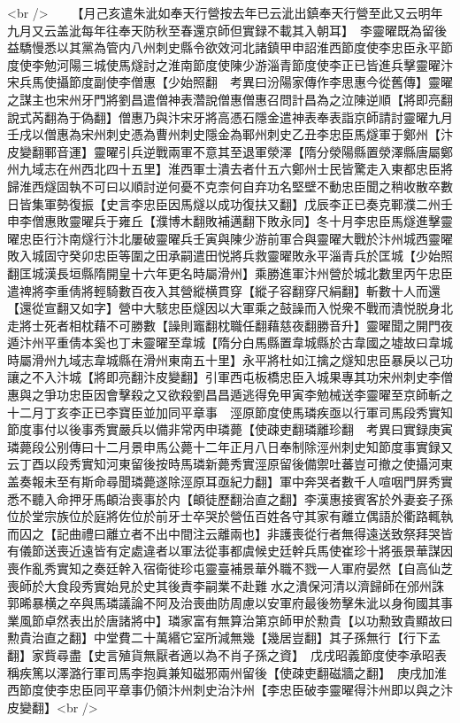 <br />
　　【月己亥遣朱泚如奉天行營按去年已云泚出鎮奉天行營至此又云明年九月又云盖泚每年往奉天防秋至春還京師但實録不載其入朝耳】　李靈曜既為留後益驕慢悉以其黨為管内八州刺史縣令欲效河北諸鎮甲申詔淮西節度使李忠臣永平節度使李勉河陽三城使馬燧討之淮南節度使陳少游淄青節度使李正已皆進兵擊靈曜汴宋兵馬使攝節度副使李僧惠【少始照翻　考異曰汾陽家傳作李思惠今從舊傳】靈曜之謀主也宋州牙門將劉昌遣僧神表濳說僧惠僧惠召問計昌為之泣陳逆順【將即亮翻說式芮翻為于偽翻】僧惠乃與汴宋牙將高憑石隱金遣神表奉表詣京師請討靈曜九月壬戌以僧惠為宋州刺史憑為曹州刺史隱金為鄆州刺史乙丑李忠臣馬燧軍于鄭州【汴皮變翻鄆音運】靈曜引兵逆戰兩軍不意其至退軍滎澤【隋分滎陽縣置滎澤縣唐屬鄭州九域志在州西北四十五里】淮西軍士潰去者什五六鄭州士民皆驚走入東都忠臣將歸淮西燧固執不可曰以順討逆何憂不克柰何自弃功名堅壁不動忠臣聞之稍收散卒數日皆集軍勢復振【史言李忠臣因馬燧以成功復扶又翻】戊辰李正已奏克鄆濮二州壬申李僧惠敗靈曜兵于雍丘【濮博木翻敗補邁翻下敗永同】冬十月李忠臣馬燧進擊靈曜忠臣行汴南燧行汴北屢破靈曜兵壬寅與陳少游前軍合與靈曜大戰於汴州城西靈曜敗入城固守癸卯忠臣等圍之田承嗣遣田悦將兵救靈曜敗永平淄青兵於匡城【少始照翻匡城漢長垣縣隋開皇十六年更名時屬滑州】乘勝進軍汴州營於城北數里丙午忠臣遣禆將李重倩將輕騎數百夜入其營縱横貫穿【縱子容翻穿尺絹翻】斬數十人而還【還從宣翻又如字】營中大駭忠臣燧因以大軍乘之鼓譟而入悦衆不戰而潰悦脱身北走將士死者相枕藉不可勝數【譟則竈翻枕職任翻藉慈夜翻勝音升】靈曜聞之開門夜遁汴州平重倩本奚也丁未靈曜至韋城【隋分白馬縣置韋城縣於古韋國之墟故曰韋城時屬滑州九域志韋城縣在滑州東南五十里】永平將杜如江擒之燧知忠臣暴戾以己功讓之不入汴城【將即亮翻汴皮變翻】引軍西屯板橋忠臣入城果專其功宋州刺史李僧惠與之爭功忠臣因會擊殺之又欲殺劉昌昌遁逃得免甲寅李勉械送李靈曜至京師斬之　十二月丁亥李正已李寶臣並加同平章事　涇原節度使馬璘疾亟以行軍司馬段秀實知節度事付以後事秀實嚴兵以備非常丙申璘薨【使疎吏翻璘離珍翻　考異曰實録庚寅璘薨段公别傳曰十二月景申馬公薨十二年正月八日奉制除涇州刺史知節度事實録又云丁酉以段秀實知河東留後按時馬璘新薨秀實涇原留後備禦吐蕃豈可撤之使攝河東盖奏報未至有斯命尋聞璘薨遂除涇原耳亟紀力翻】軍中奔哭者數千人喧咽門屏秀實悉不聽入命押牙馬頔治喪事於内【頔徒歷翻治直之翻】李漢惠接賓客於外妻妾子孫位於堂宗族位於庭將佐位於前牙士卒哭於營伍百姓各守其家有離立偶語於衢路輒執而囚之【記曲禮曰離立者不出中間注云離兩也】非護喪從行者無得遠送致祭拜哭皆有儀節送喪近遠皆有定處違者以軍法從事都虞候史廷幹兵馬使崔珍十將張景華謀因喪作亂秀實知之奏廷幹入宿衛徙珍屯靈臺補景華外職不戮一人軍府晏然【自高仙芝喪師於大食段秀實始見於史其後責李嗣業不赴難水之潰保河清以濟歸師在邠州誅郭晞暴横之卒與馬璘議論不阿及治喪曲防周慮以安軍府最後笏擊朱泚以身徇國其事業風節卓然表出於唐諸將中】璘家富有無算治第京師甲於勲貴【以功勲致貴顯故曰勲貴治直之翻】中堂費二十萬緡它室所減無幾【幾居豈翻】其子孫無行【行下孟翻】家貲尋盡【史言殖貨無厭者適以為不肖子孫之資】　戊戌昭義節度使李承昭表稱疾篤以澤潞行軍司馬李抱眞兼知磁邪兩州留後【使疎吏翻磁牆之翻】　庚戌加淮西節度使李忠臣同平章事仍領汴州刺史治汴州【李忠臣破李靈曜得汴州即以與之汴皮變翻】<br />
